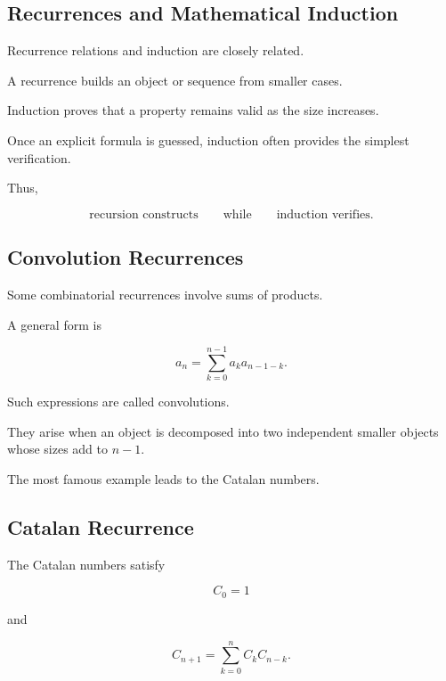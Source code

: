 \subsection{Recurrences and Mathematical Induction}
\label{subsec:recurrences-induction}

Recurrence relations and induction are closely related.

A recurrence builds an object or sequence from smaller cases.

Induction proves that a property remains valid as the size increases.

Once an explicit formula is guessed, induction often provides the
simplest verification.

Thus,

\[
\boxed{
\text{recursion constructs}
\qquad
\text{while}
\qquad
\text{induction verifies}.
}
\]

\subsection{Convolution Recurrences}
\label{subsec:convolution-recurrences}

Some combinatorial recurrences involve sums of products.

A general form is

\[
\boxed{
a_n
=
\sum_{k=0}^{n-1}
a_k a_{n-1-k}.
}
\]

Such expressions are called convolutions.

They arise when an object is decomposed into two independent smaller
objects whose sizes add to \(n-1\).

The most famous example leads to the Catalan numbers.

\subsection{Catalan Recurrence}
\label{subsec:catalan-recurrence}

The Catalan numbers satisfy

\[
C_0=1
\]

and

\[
\boxed{
C_{n+1}
=
\sum_{k=0}^{n}
C_kC_{n-k}.
}
\]

